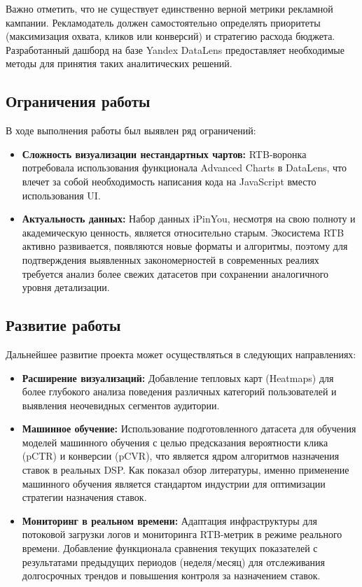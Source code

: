 Важно отметить, что не существует единственно верной метрики рекламной кампании. Рекламодатель должен самостоятельно определять приоритеты (максимизация охвата, кликов или конверсий) и стратегию расхода бюджета. Разработанный дашборд на базе Yandex DataLens предоставляет необходимые методы для принятия таких аналитических решений.

\subsection{Ограничения работы}

В ходе выполнения работы был выявлен ряд ограничений:
\begin{itemize}
    \item \textbf{Сложность визуализации нестандартных чартов:} RTB-воронка потребовала использования функционала Advanced Charts в DataLens, что влечет за собой необходимость написания кода на JavaScript вместо использования UI.
    \item \textbf{Актуальность данных:} Набор данных iPinYou, несмотря на свою полноту и академическую ценность, является относительно старым. Экосистема RTB активно развивается, появляются новые форматы и алгоритмы, поэтому для подтверждения выявленных закономерностей в современных реалиях требуется анализ более свежих датасетов при сохранении аналогичного уровня детализации.
\end{itemize}

\subsection{Развитие работы}

Дальнейшее развитие проекта может осуществляться в следующих направлениях:
\begin{itemize}
    \item \textbf{Расширение визуализаций:} Добавление тепловых карт (Heatmaps) для более глубокого анализа поведения различных категорий пользователей и выявления неочевидных сегментов аудитории.
    \item \textbf{Машинное обучение:} Использование подготовленного датасета для обучения моделей машинного обучения с целью предсказания вероятности клика (pCTR) и конверсии (pCVR), что является ядром алгоритмов назначения ставок в реальных DSP. Как показал обзор литературы, именно применение машинного обучения является стандартом индустрии для оптимизации стратегии назначения ставок.
    \item \textbf{Мониторинг в реальном времени:} Адаптация инфраструктуры для потоковой загрузки логов и мониторинга RTB-метрик в режиме реального времени. Добавление функционала сравнения текущих показателей с результатами предыдущих периодов (неделя/месяц) для отслеживания долгосрочных трендов и повышения контроля за назначением ставок.
\end{itemize}

